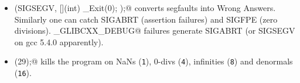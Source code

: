 \begin{itemize}
    \item \verb@signal(SIGSEGV, [](int) { _Exit(0); });@ converts segfaults into Wrong Answers.
        Similarly one can catch SIGABRT (assertion failures) and SIGFPE (zero divisions).
        \verb@_GLIBCXX_DEBUG@ failures generate SIGABRT (or SIGSEGV on gcc 5.4.0 apparently).
    \item \verb@feenableexcept(29);@ kills the program on NaNs (\texttt 1), 0-divs (\texttt 4), infinities (\texttt 8) and denormals (\texttt{16}).
\end{itemize}